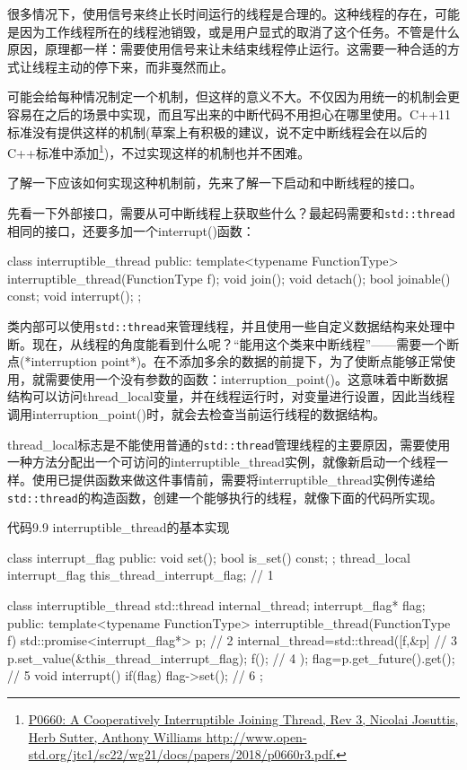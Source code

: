 
很多情况下，使用信号来终止长时间运行的线程是合理的。这种线程的存在，可能是因为工作线程所在的线程池销毁，或是用户显式的取消了这个任务。不管是什么原因，原理都一样：需要使用信号来让未结束线程停止运行。这需要一种合适的方式让线程主动的停下来，而非戛然而止。

可能会给每种情况制定一个机制，但这样的意义不大。不仅因为用统一的机制会更容易在之后的场景中实现，而且写出来的中断代码不用担心在哪里使用。C++11标准没有提供这样的机制(草案上有积极的建议，说不定中断线程会在以后的C++标准中添加\footnote[1]{\url{P0660: A Cooperatively Interruptible Joining Thread, Rev 3, Nicolai Josuttis, Herb Sutter, Anthony Williams http://www.open-std.org/jtc1/sc22/wg21/docs/papers/2018/p0660r3.pdf.}})，不过实现这样的机制也并不困难。

了解一下应该如何实现这种机制前，先来了解一下启动和中断线程的接口。


先看一下外部接口，需要从可中断线程上获取些什么？最起码需要和\texttt{std::thread}相同的接口，还要多加一个interrupt()函数：

\begin{cpp}
class interruptible_thread
{
public:
  template<typename FunctionType>
  interruptible_thread(FunctionType f);
  void join();
  void detach();
  bool joinable() const;
  void interrupt();
};
\end{cpp}

类内部可以使用\texttt{std::thread}来管理线程，并且使用一些自定义数据结构来处理中断。现在，从线程的角度能看到什么呢？“能用这个类来中断线程”——需要一个断点(*interruption point*)。在不添加多余的数据的前提下，为了使断点能够正常使用，就需要使用一个没有参数的函数：interruption\_point()。这意味着中断数据结构可以访问thread\_local变量，并在线程运行时，对变量进行设置，因此当线程调用interruption\_point()时，就会去检查当前运行线程的数据结构。

thread\_local标志是不能使用普通的\texttt{std::thread}管理线程的主要原因，需要使用一种方法分配出一个可访问的interruptible\_thread实例，就像新启动一个线程一样。使用已提供函数来做这件事情前，需要将interruptible\_thread实例传递给\texttt{std::thread}的构造函数，创建一个能够执行的线程，就像下面的代码所实现。

代码9.9 interruptible\_thread的基本实现

\begin{cpp}
class interrupt_flag
{
public:
  void set();
  bool is_set() const;
};
thread_local interrupt_flag this_thread_interrupt_flag;  // 1

class interruptible_thread
{
  std::thread internal_thread;
  interrupt_flag* flag;
public:
  template<typename FunctionType>
  interruptible_thread(FunctionType f)
  {
    std::promise<interrupt_flag*> p;  // 2
    internal_thread=std::thread([f,&p]{  // 3
      p.set_value(&this_thread_interrupt_flag);
      f();  // 4
    });
    flag=p.get_future().get();  // 5
  }
  void interrupt()
  {
    if(flag)
    {
      flag->set();  // 6
    }
  }
};
\end{cpp}

